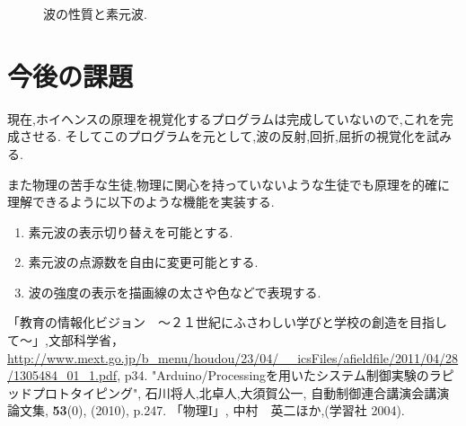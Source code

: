 \documentclass[a4j,twocolumn,uplatex]{jarticle}
\begin{document}
\begin{figure}[htbp]
\caption{{\footnotesize 波の性質と素元波.}}
\label{fig:thomson2clausius}
\end{figure}
\vspace{-7mm}

\section{今後の課題}
現在,ホイヘンスの原理を視覚化するプログラムは完成していないので,これを完成させる.
そしてこのプログラムを元として,波の反射,回折,屈折の視覚化を試みる.

また物理の苦手な生徒,物理に関心を持っていないような生徒でも原理を的確に理解できるように以下のような機能を実装する.
\begin{enumerate}
\item 素元波の表示切り替えを可能とする.
\item 素元波の点源数を自由に変更可能とする.
\item 波の強度の表示を描画線の太さや色などで表現する.
\end{enumerate}

\vspace{-5mm}
\begin{thebibliography}{9}
「教育の情報化ビジョン　〜２１世紀にふさわしい学びと学校の創造を目指して〜」,文部科学省，\url{http://www.mext.go.jp/b_menu/houdou/23/04/__icsFiles/afieldfile/2011/04/28/1305484_01_1.pdf}, p34.
 "Arduino/Processingを用いたシステム制御実験のラピッドプロトタイピング", 石川将人,北卓人,大須賀公一, 自動制御連合講演会講演論文集, {\bf 53}(0), (2010), p.247.
 「物理I」, 中村　英二ほか,(学習社 2004).


\end{thebibliography}
\end{document}
